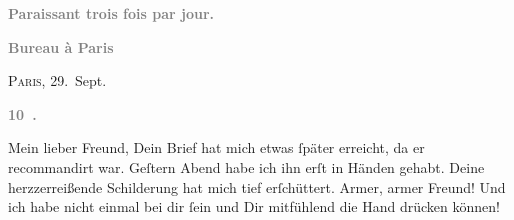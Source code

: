 \pstart
           \begin{otherlanguage}{french}\textcolor{gray}{\textbf{\textbf{Paraissant trois fois par jour.}}}\end{otherlanguage}\pend
           
\pstart
           \begin{otherlanguage}{french}\textcolor{gray}{\textbf{\textbf{Bureau à Paris}}}\end{otherlanguage}\hfill \textsc{Paris}, 29. Sept.\pend
           
\pstart
           \begin{otherlanguage}{french}\textcolor{gray}{\textbf{\textbf{10 .}}}\end{otherlanguage}\pend
           
\pstart\center{}Mein lieber Freund,\pend\vspace{0.5em}
\pstart
           Dein Brief hat mich etwas{ }ſpäter erreicht, da er recommandirt war. Geſtern{ }Abend habe ich ihn erſt in Händen gehabt. Deine herzzerreißende
               Schilderung hat mich tief erſchüttert. Armer, armer Freund! Und ich habe nicht einmal
               bei dir{ }ſein und Dir mitfühlend die Hand drücken können!\pend
           
